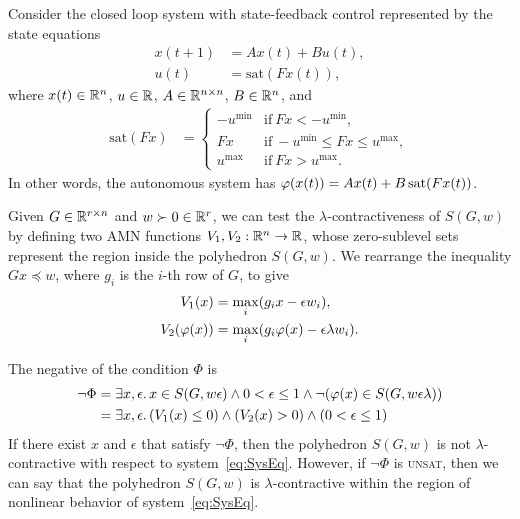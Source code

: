 Consider the closed loop system with state-feedback control
represented by the state equations
\begin{equation}
	\begin{aligned}
		x(t+1) &= Ax(t) + Bu(t), \\
		u(t) &= \text{sat}(Fx(t)),
	\end{aligned}
	\label{eq:SysEq} 
\end{equation}
where $x(t) \in \mathbb{R}^n$, $u \in \mathbb{R}$, $A \in \mathbb{R}^{n\times n}$, $B \in
\mathbb{R}^{n}$, and
\begin{align*}
\text{sat}(Fx) &= \begin{cases} -u^\text{min} &\text{if} ~ Fx < -u^\text{min}, 
\\Fx &\text{if} ~ -u^\text{min} \leq Fx \leq u^\text{max},
\\u^\text{max} &\text{if} ~ Fx > u^\text{max}.
\end{cases}
\end{align*}
In other words, the autonomous system has $\varphi(x(t)) = Ax(t) + B\mathop{\rm sat}(Fx(t))$.

Given $G\in \mathbb{R}^{r\times n}$ and $w \succ 0 \in \mathbb{R}^r$, we can test the
$\lambda$-contractiveness of $S(G,w)$ by defining two AMN functions $V_1,V_2
: \mathbb{R}^n \rightarrow \mathbb{R}$, whose zero-sublevel sets represent 
the region inside the polyhedron $S(G,w)$.  We rearrange the inequality
$Gx\preceq w$, where $g_i$ is the $i$-th row of $G$, to give
\begin{align*}
	V_1(x) &= \max_i (g_ix - \epsilon w_i),\\
	V_2(\varphi(x)) &= \max_i (g_i \varphi(x) - \epsilon \lambda w_i).
\end{align*}

The negative of the condition $\Phi$ is
\begin{align*}
\label{eq:SatSpec} \neg \Phi &= \exists x,\epsilon.\, 
	x\in S(G,w\epsilon)\wedge 0<\epsilon\leq 1
	\wedge \neg(\varphi(x) \in S(G,w\epsilon \lambda) ) \\
	&= \exists x,\epsilon.\,  (V_1(x)\leq 0) \wedge (V_2(x) > 0 ) \wedge (0< \epsilon \leq 1)
\end{align*}
If there exist $x$ and $\epsilon$ that satisfy $\neg\Phi$, then the
polyhedron $S(G,w)$ is not $\lambda$-contractive with respect to
system~\eqref{eq:SysEq}. However, if $\neg \Phi$ is \textsc{unsat}, then we can
say that the polyhedron $S(G,w)$ is $\lambda$-contractive within the region of
nonlinear behavior of system~\eqref{eq:SysEq}.

